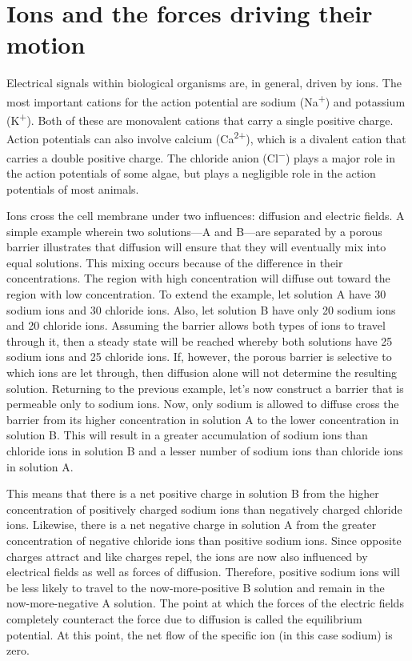 \hypertarget{ions-and-the-forces-driving-their-motion}{%
\section{Ions and the forces driving their motion}\label{ions-and-the-forces-driving-their-motion}}

Electrical signals within biological organisms are, in general, driven by ions. The most important cations for the action potential are sodium (Na\textsuperscript{+}) and potassium (K\textsuperscript{+}). Both of these are monovalent cations that carry a single positive charge. Action potentials can also involve calcium (Ca\textsuperscript{2+}), which is a divalent cation that carries a double positive charge. The chloride anion (Cl\textsuperscript{−}) plays a major role in the action potentials of some algae, but plays a negligible role in the action potentials of most animals.

Ions cross the cell membrane under two influences: diffusion and electric fields. A simple example wherein two solutions---A and B---are separated by a porous barrier illustrates that diffusion will ensure that they will eventually mix into equal solutions. This mixing occurs because of the difference in their concentrations. The region with high concentration will diffuse out toward the region with low concentration. To extend the example, let solution A have 30 sodium ions and 30 chloride ions. Also, let solution B have only 20 sodium ions and 20 chloride ions. Assuming the barrier allows both types of ions to travel through it, then a steady state will be reached whereby both solutions have 25 sodium ions and 25 chloride ions. If, however, the porous barrier is selective to which ions are let through, then diffusion alone will not determine the resulting solution. Returning to the previous example, let's now construct a barrier that is permeable only to sodium ions. Now, only sodium is allowed to diffuse cross the barrier from its higher concentration in solution A to the lower concentration in solution B. This will result in a greater accumulation of sodium ions than chloride ions in solution B and a lesser number of sodium ions than chloride ions in solution A.

This means that there is a net positive charge in solution B from the higher concentration of positively charged sodium ions than negatively charged chloride ions. Likewise, there is a net negative charge in solution A from the greater concentration of negative chloride ions than positive sodium ions. Since opposite charges attract and like charges repel, the ions are now also influenced by electrical fields as well as forces of diffusion. Therefore, positive sodium ions will be less likely to travel to the now-more-positive B solution and remain in the now-more-negative A solution. The point at which the forces of the electric fields completely counteract the force due to diffusion is called the equilibrium potential. At this point, the net flow of the specific ion (in this case sodium) is zero.

